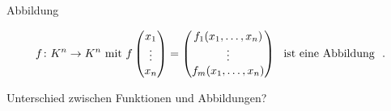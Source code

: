 \documentclass[class=article, crop=false]{standalone}
\begin{document}
\begin{zettel}{Abbildung}
\begin{flashcard}
\begin{definition}[Abbildung]
\[
f \from K^n\to  K^n \tx{mit} f \begin{pmatrix}
x_1 \\
\vdots \\
x_n \\
\end{pmatrix} =
\begin{pmatrix}
f_1 (x_1, \dots , x_n) \\
\vdots \\
f_m (x_1, \dots, x_n) \\
\end{pmatrix} \tx{ ist eine Abbildung } 
.\]

\end{definition}
\end{flashcard}

Unterschied zwischen Funktionen und Abbildungen?
\end{zettel}
\end{document}

